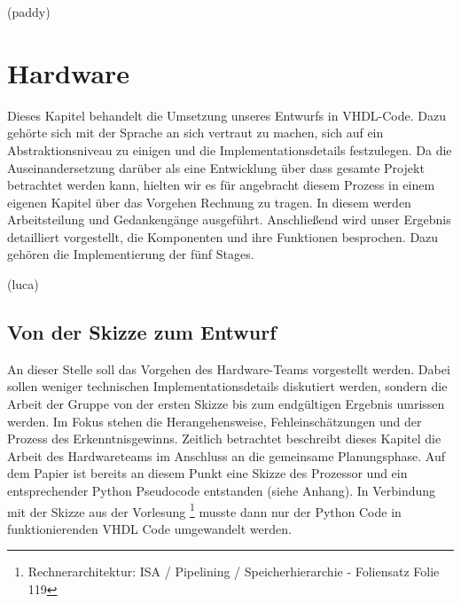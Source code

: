 \documentclass[paper=a4,fontsize=12pt,twocolumn]{scrreprt}
\begin{document}
%
%
%

(paddy)

\chapter{Hardware}

Dieses Kapitel behandelt die Umsetzung unseres Entwurfs in VHDL-Code.
Dazu gehörte sich mit der Sprache an sich vertraut zu machen, sich auf ein Abstraktionsniveau zu einigen und die Implementationsdetails festzulegen.
Da die Auseinandersetzung darüber als eine Entwicklung über dass gesamte Projekt betrachtet werden kann, hielten wir es für angebracht diesem Prozess in einem eigenen Kapitel über das Vorgehen Rechnung zu tragen.
In diesem werden Arbeitsteilung und Gedankengänge ausgeführt. %
Anschließend wird unser Ergebnis detailliert vorgestellt, die Komponenten und ihre Funktionen besprochen. Dazu gehören die Implementierung der fünf Stages. %



(luca)

\section{Von der Skizze zum Entwurf}

An dieser Stelle soll das Vorgehen des Hardware-Teams vorgestellt werden.
Dabei sollen weniger technischen Implementationsdetails diskutiert werden, sondern die Arbeit der Gruppe von der ersten Skizze bis zum endgültigen Ergebnis umrissen werden.
Im Fokus stehen die Herangehensweise, Fehleinschätzungen und der Prozess des Erkenntnisgewinns.
Zeitlich betrachtet beschreibt dieses Kapitel die Arbeit des Hardwareteams im Anschluss an die gemeinsame Planungsphase.
Auf dem Papier ist bereits an diesem Punkt eine Skizze des Prozessor und ein entsprechender Python Pseudocode entstanden (siehe Anhang).
In Verbindung mit der Skizze aus der Vorlesung \footnote{Rechnerarchitektur: ISA / Pipelining / Speicherhierarchie - Foliensatz Folie 119} musste dann nur der Python Code in funktionierenden VHDL Code umgewandelt werden.
\end{document}
